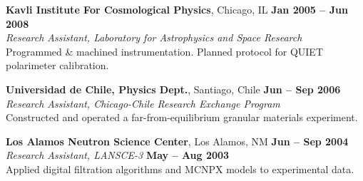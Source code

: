 \documentclass[margin,line]{resume}
\begin{document}
\begin{resume}
    \textbf{Kavli Institute For Cosmological Physics}, Chicago, IL \hfill \textbf{Jan 2005 -- Jun 2008}\\
                \textsl{Research Assistant, Laboratory for Astrophysics and Space Research}\\
                Programmed \& machined instrumentation. Planned protocol for QUIET polarimeter calibration.

    \textbf{Universidad de Chile, Physics Dept.}, Santiago, Chile \hfill \textbf{Jun -- Sep 2006}\\
                \textsl{Research Assistant, Chicago-Chile Research Exchange Program}\\
                 Constructed and operated a far-from-equilibrium granular
                 materials experiment.

    \textbf{Los Alamos Neutron Science Center}, Los Alamos, NM \hfill \textbf{Jun -- Sep 2004}\\
                \textsl{Research Assistant, LANSCE-3} \hfill \textbf{May -- Aug 2003}\\
                Applied digital filtration algorithms and MCNPX models to experimental data.

\end{resume}
\end{document}
